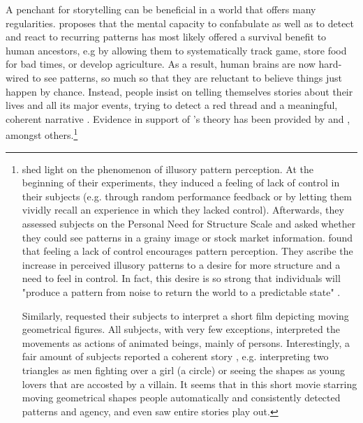 \documentclass[11pt,a4paper,english,oneside]{book}
\numberwithin{equation}{chapter}
\begin{document}
A penchant for storytelling can be beneficial in a world that offers many regularities. \citeauthor{Atran.2010} proposes that the mental capacity to confabulate as well as to detect and react to recurring patterns has most likely offered a survival benefit to human ancestors, e.g by allowing them to systematically track game, store food for bad times, or develop agriculture. As a result, human brains are now hard-wired to see patterns, so much so that they are  reluctant  to believe things just happen by chance. Instead, people  insist on telling themselves stories about their lives and all its major events, trying   to  detect  a  red thread 
and a meaningful, coherent  narrative \cite[p.~435--436]{Atran.2010}. Evidence in support of \citeauthor{Atran.2010}'s theory has been provided by \citet{Whitson.2008} and \cite{HeiderF.andSimmelM..}, amongst others.\footnote{\citet{Whitson.2008} shed light on the phenomenon of illusory pattern perception. At the beginning of their experiments, they induced a feeling of lack of control in their subjects (e.g. through random performance feedback or by letting them vividly recall an experience in which they lacked control). Afterwards, they assessed subjects on the Personal Need for Structure Scale and asked whether they could see patterns in a grainy image or stock market information. \citeauthor{Whitson.2008} found that feeling a lack of control encourages pattern perception. They ascribe the increase in perceived illusory patterns to a desire for more structure and a need to feel in control. In fact, this desire is so strong that individuals will "produce a pattern from noise to return the world to a predictable state" \citep[p.~117]{Whitson.2008}.
		
Similarly, \cite{HeiderF.andSimmelM..} requested their subjects to interpret a short film depicting moving geometrical figures. All subjects, with very few exceptions, interpreted the movements as actions of animated beings, mainly of persons. Interestingly, a fair amount of subjects reported a coherent story \citep[~p.246]{HeiderF.andSimmelM..}, e.g. interpreting two triangles as men fighting over a girl (a circle) or seeing the shapes as young lovers that are accosted by a villain. It seems that in this short movie starring moving geometrical shapes people automatically and consistently detected patterns and agency, and even saw entire stories play out. }
\end{document}
